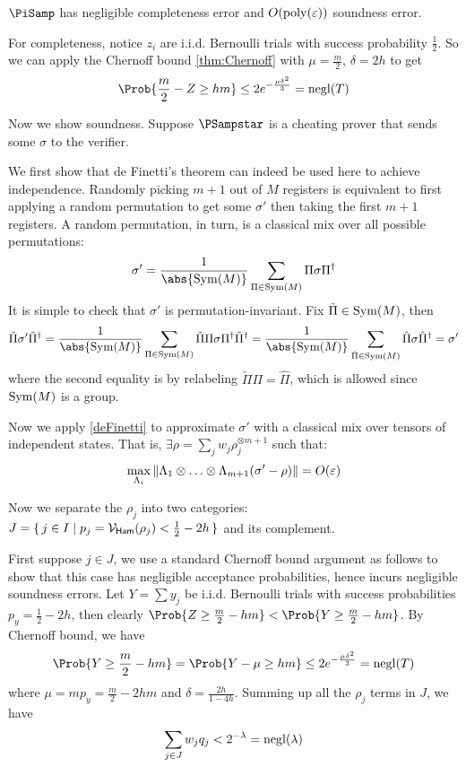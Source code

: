 \begin{thm}
    \label{QPIP1thm}
	$\PiSamp$ has negligible completeness error and $O(\operatorname*{\operatorname{poly}}(\varepsilon))$ soundness error.
\end{thm}
\begin{prf}
	For completeness, notice $z_i$ are i.i.d. Bernoulli trials with success probability $\frac{1}{2}$.
	So we can apply the Chernoff bound \cref{thm:Chernoff} with $\mu=\frac{m}{2}$, $\delta=2h$ to get
	$$\Prob{\frac{m}{2}-Z\geq hm}\leq2e^{-\frac{\mu\delta^2}{3}}=\negl(T)$$

	Now we show soundness.
	Suppose $\PSampstar$ is a cheating prover that sends some $\sigma$ to the verifier.

	We first show that de Finetti's theorem can indeed be used here to achieve independence.
	Randomly picking $m+1$ out of $M$ registers is equivalent to first applying a random permutation to get some $\sigma'$ then taking the first $m+1$ registers.
	A random permutation, in turn, is a classical mix over all possible permutations:
	$$\sigma'=\frac{1}{\abs{\Sym(M)}}\sum_{\Pi\in\Sym(M)}\Pi\sigma\Pi^\dagger$$
	It is simple to check that $\sigma'$ is permutation-invariant.
	Fix $\tilde{\Pi}\in\operatorname{Sym}(M)$, then
	$$\tilde{\Pi}\sigma'\tilde{\Pi}^\dagger
	=\frac{1}{\abs{\Sym(M)}}\sum_{\Pi\in\Sym(M)}\tilde{\Pi}\Pi\sigma\Pi^\dagger\tilde{\Pi}^\dagger
	=\frac{1}{\abs{\Sym(M)}}\sum_{\hat{\Pi}\in\Sym(M)}\hat{\Pi}\sigma\hat{\Pi}^\dagger
	=\sigma'$$
	where the second equality is by relabeling $\tilde{\Pi}\Pi=\hat{\Pi}$, which is allowed since $\operatorname{Sym}(M)$ is a group.

	Now we apply \cref{deFinetti} to approximate $\sigma'$ with a classical mix over tensors of independent states.
	That is, $\exists\rho=\sum_j w_j\rho_j^{\otimes m+1}$ such that:
	$$\max_{\Lambda_i}\left\lVert\Lambda_1\otimes\ldots\otimes\Lambda_{m+1}(\sigma'-\rho)\right\rVert=O(\varepsilon)$$

	Now we separate the $\rho_j$ into two categories: $J=\set{j\in I|p_j=\mathcal{V}_{\mathsf{Ham}}(\rho_j)<\frac{1}{2}-2h}$ and its complement.

	First suppose $j\in J$, we use a standard Chernoff bound argument as follows to show that this case has negligible acceptance probabilities,
	hence incurs negligible soundness errors.
	Let $Y=\sum y_j$ be i.i.d. Bernoulli trials with success probabilities $p_y=\frac{1}{2}-2h$,
	then clearly $\Prob{Z\geq\frac{m}{2}-hm}<\Prob{Y\geq\frac{m}{2}-hm}$.
	By Chernoff bound, we have
	$$\Prob{Y\geq\frac{m}{2}-hm}=\Prob{Y-\mu\geq hm}\leq2e^{-\frac{\mu\delta^2}{3}}=\negl(T)$$
	where $\mu=mp_y=\frac{m}{2}-2hm$ and $\delta=\frac{2h}{1-4h}$.
	Summing up all the $\rho_j$ terms in $J$, we have
	$$\sum_{j\in J} w_j q_j<2^{-\lambda}=\operatorname{negl}(\lambda)$$


\end{prf}
